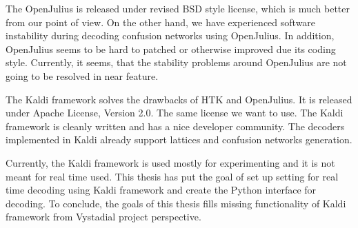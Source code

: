 The OpenJulius is released under revised BSD style license, which is much better from our point of view. On the other hand, we have experienced software instability during decoding confusion networks using OpenJulius. In addition, OpenJulius seems to be hard to patched or otherwise improved due its coding style. Currently, it seems, that the stability problems around OpenJulius are not going to be resolved in near feature.

The Kaldi framework solves the drawbacks of HTK and OpenJulius. It is released under Apache License, Version 2.0. The same license we want to use. The Kaldi framework is cleanly written and has a nice developer community.
The decoders implemented in Kaldi already support lattices and confusion networks generation. 


Currently, the Kaldi framework is used mostly for experimenting and it is not meant for real time used.
This thesis has put the goal of set up setting for real time decoding using Kaldi framework and create the Python interface for decoding. To conclude, the goals of this thesis fills missing functionality of Kaldi framework from Vystadial project perspective. 





